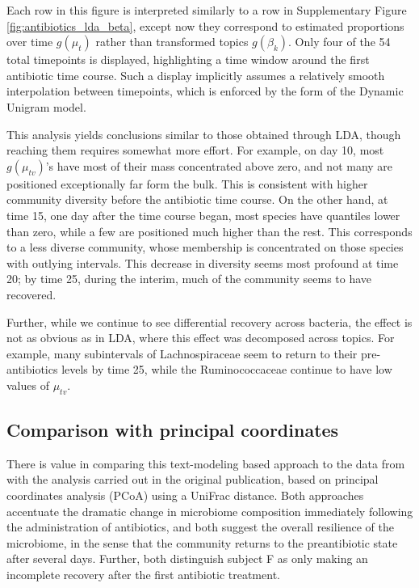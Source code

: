 Each row in this figure is interpreted similarly to a row in Supplementary
Figure \ref{fig:antibiotics_lda_beta}, except now they correspond to estimated
proportions over time $g\left(\mu_{t}\right)$ rather than transformed topics
$g\left(\beta_{k}\right)$. Only four of the 54 total timepoints is displayed,
highlighting a time window around the first antibiotic time course. Such a
display implicitly assumes a relatively smooth interpolation between timepoints,
which is enforced by the form of the Dynamic Unigram model.

This analysis yields conclusions similar to those obtained through LDA, though
reaching them requires somewhat more effort. For example, on day 10, most
$g\left(\mu_{tv}\right)$'s have most of their mass concentrated above zero, and
not many are positioned exceptionally far form the bulk. This is consistent with
higher community diversity before the antibiotic time course. On the other hand,
at time 15, one day after the time course began, most species have quantiles
lower than zero, while a few are positioned much higher than the rest. This
corresponds to a less diverse community, whose membership is concentrated on
those species with outlying intervals. This decrease in diversity seems most
profound at time 20; by time 25, during the interim, much of the community seems
to have recovered.

Further, while we continue to see differential recovery across bacteria, the
effect is not as obvious as in LDA, where this effect was decomposed across
topics. For example, many subintervals of Lachnospiraceae seem to return to
their pre-antibiotics levels by time 25, while the Ruminococcaceae continue to
have low values of $\mu_{tv}$.

\subsection{Comparison with principal coordinates}
\label{subsec:comparison_with_pcoa}

There is value in comparing this text-modeling based approach to the data from
\citep{dethlefsen2011incomplete} with the analysis carried out in the original
publication, based on principal coordinates analysis (PCoA) using a UniFrac
distance. Both approaches accentuate the dramatic change in microbiome
composition immediately following the administration of antibiotics, and both
suggest the overall resilience of the microbiome, in the sense that the
community returns to the preantibiotic state after several days. Further, both
distinguish subject F as only making an incomplete recovery after the first
antibiotic treatment.


